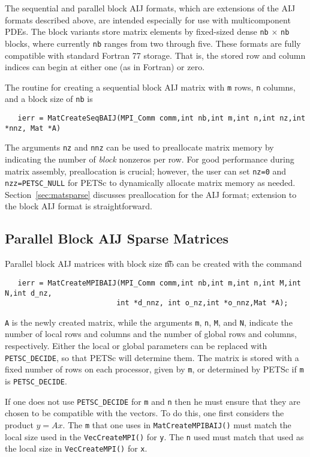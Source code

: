 The sequential and parallel block AIJ formats, which are extensions of
the AIJ formats described above, are intended especially for use with
multicomponent PDEs.  The block variants store matrix elements by
fixed-sized dense {\tt nb} $\times$ {\tt nb} blocks, where currently
{\tt nb} ranges from two through five.  These formats are fully
compatible with standard Fortran 77 storage.  That is, the stored row
and column indices can begin at either one (as in Fortran) or zero.

The routine for creating a sequential block AIJ matrix with {\tt m} 
rows, {\tt n} columns, and a block size of {\tt nb} is
\begin{verbatim}
   ierr = MatCreateSeqBAIJ(MPI_Comm comm,int nb,int m,int n,int nz,int *nnz, Mat *A)
\end{verbatim}
The arguments {\tt nz} and {\tt nnz} can be used to preallocate matrix
memory by indicating the number of {\em block} nonzeros per row.  For good
performance during matrix assembly, preallocation is crucial; however, the
user can set {\tt nz=0} and {\tt nzz=PETSC\_NULL} for PETSc to dynamically
allocate matrix memory as needed.  Section~\ref{sec:matsparse}
discusses preallocation for the AIJ format; extension to the block AIJ
format is straightforward.

\subsection{Parallel Block AIJ Sparse Matrices}

Parallel block AIJ matrices with block size {\t nb} can be created with
the command 
\begin{verbatim}
   ierr = MatCreateMPIBAIJ(MPI_Comm comm,int nb,int m,int n,int M,int N,int d_nz,
                          int *d_nnz, int o_nz,int *o_nnz,Mat *A);
\end{verbatim}
{\tt A} is the newly created matrix, while the arguments {\tt m}, {\tt n}, 
{\tt M}, and {\tt N}, indicate the number of local rows and columns and
the number of global rows and columns, respectively. Either the local or
global parameters can be replaced with {\tt PETSC\_DECIDE}, so that 
PETSc will determine  them.
The matrix is stored with a fixed number of rows on 
each processor, given by {\tt m}, or determined by PETSc if {\tt m} is
{\tt PETSC\_DECIDE}.

If one does not use {\tt PETSC\_DECIDE} for
{\tt m} and {\tt n} then he must ensure that they are chosen to be
compatible with the vectors. To do this, one first considers the product 
$y = A x$. The {\tt m} that one uses in {\tt MatCreateMPIBAIJ()}
must match the local size used in the {\tt VecCreateMPI()} for {\tt y}.
The {\tt n} used must match that used as the local size in 
{\tt VecCreateMPI()} for {\tt x}. 

